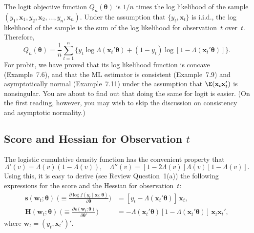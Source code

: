 The logit objective function $Q_n(\boldsymbol{\theta})$ is $1/n$ times the log likelihood of the sample
$(y_1, \mathbf{x}_1, y_2, \mathbf{x}_2, \ldots, y_n, \mathbf{x}_n)$. Under the assumption that
$\{y_t, \mathbf{x}_t\}$ is i.i.d., the log likelihood of the sample is the sum of the log likelihood
for observation~$t$ over~$t$. Therefore,
\begin{equation}
  Q_n(\boldsymbol{\theta})
  = \frac{1}{n} \sum_{t=1}^{n}
    \bigl\{ y_t \log \Lambda(\mathbf{x}_t'\boldsymbol{\theta})
    + (1 - y_t) \log[1 - \Lambda(\mathbf{x}_t'\boldsymbol{\theta})] \bigr\}.
  \label{eq:8.1.5} \tag{8.1.5}
\end{equation}
For probit, we have proved that its log likelihood function is concave (Example~7.6),
and that the ML estimator is consistent (Example~7.9) and asymptotically
normal (Example~7.11) under the assumption that $\E(\mathbf{x}_t\mathbf{x}_t')$ is nonsingular. You
are about to find out that doing the same for logit is easier. (On the first reading,
however, you may wish to skip the discussion on consistency and asymptotic
normality.)

\subsection*{Score and Hessian for Observation \texorpdfstring{$t$}{t}}

The logistic cumulative density function has the convenient property that
\begin{equation}
  \Lambda'(v) = \Lambda(v)(1 - \Lambda(v)), \quad
  \Lambda''(v) = [1 - 2\Lambda(v)]\Lambda(v)[1 - \Lambda(v)].
  \label{eq:8.1.6} \tag{8.1.6}
\end{equation}
Using this, it is easy to derive (see Review Question~1(a)) the following expressions
for the score and the Hessian for observation~$t$:
\begin{align}
  \mathbf{s}(\mathbf{w}_t; \boldsymbol{\theta})
  \;\biggl(\equiv \frac{\partial \log f(y_t \mid \mathbf{x}_t; \boldsymbol{\theta})}
    {\partial \boldsymbol{\theta}}\biggr)
  &= [y_t - \Lambda(\mathbf{x}_t'\boldsymbol{\theta})]\,\mathbf{x}_t,
  \label{eq:8.1.7} \tag{8.1.7} \\[6pt]
  \mathbf{H}(\mathbf{w}_t; \boldsymbol{\theta})
  \;\biggl(\equiv \frac{\partial \mathbf{s}(\mathbf{w}_t; \boldsymbol{\theta})}
    {\partial \boldsymbol{\theta}'}\biggr)
  &= -\Lambda(\mathbf{x}_t'\boldsymbol{\theta})
     [1 - \Lambda(\mathbf{x}_t'\boldsymbol{\theta})]\,
     \mathbf{x}_t \mathbf{x}_t',
  \label{eq:8.1.8} \tag{8.1.8}
\end{align}
where $\mathbf{w}_t = (y_t, \mathbf{x}_t')'$.


